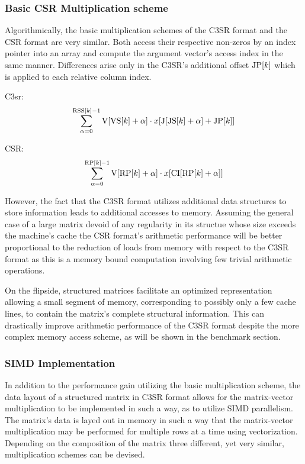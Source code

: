 \documentclass{article}
\begin{document}
    \subsubsection{Basic CSR Multiplication scheme}

      Algorithmically, the basic multiplication schemes of the C3SR format and the CSR format are very similar. Both access their respective non-zeros by an index pointer into an array and compute the argument vector's access index in the same manner. Differences arise only in the C3SR's additional offset $\JP[k]$ which is applied to each relative column index.

      C3sr:
      $$\sum \limits_{\alpha = 0}^{\RSS[k] - 1} \V[\VS[k] + \alpha] \cdot x[\J[\JS[k] + \alpha] + \JP[k]]$$

      CSR:
      $$\sum \limits_{\alpha = 0}^{\RP[k] - 1} \V[\RP[k] + \alpha] \cdot x[\CI[\RP[k] + \alpha]]$$

      However, the fact that the C3SR format utilizes additional data structures to store information leads to additional accesses to memory. Assuming the general case of a large matrix devoid of any regularity in its structue whose size exceeds the machine's cache the CSR format's arithmetic performance will be better proportional to the reduction of loads from memory with respect to the C3SR format as this is a memory bound computation involving few trivial arithmetic operations.

      On the flipside, structured matrices facilitate an optimized representation allowing a small segment of memory, corresponding to possibly only a few cache lines, to contain the matrix's complete structural information. This can drastically improve arithmetic performance of the C3SR format despite the more complex memory access scheme, as will be shown in the benchmark section.

    \subsubsection{SIMD Implementation}

      In addition to the performance gain utilizing the basic multiplication scheme, the data layout of a structured matrix in C3SR format allows for the matrix-vector multiplication to be implemented in such a way, as to utilize SIMD parallelism. The matrix's data is layed out in memory in such a way that the matrix-vector multiplication may be performed for multiple rows at a time using vectorization. Depending on the composition of the matrix three different, yet very similar, multiplication schemes can be devised.
\end{document}
